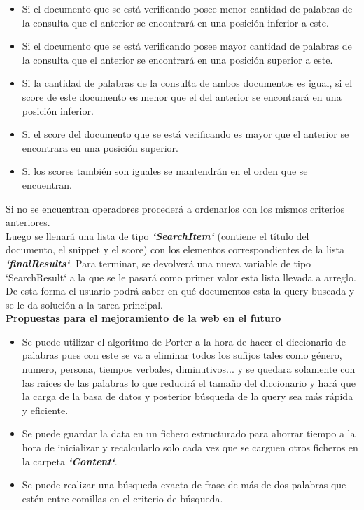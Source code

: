 \documentclass{article}
\begin{document}
\begin{flushleft}
\begin{itemize}
\item\large{Si el documento que se está verificando posee menor cantidad de palabras de la 
consulta que el anterior se encontrará en una posición inferior a este.}
\item\large{ Si el documento que se está verificando posee mayor cantidad de palabras de la 
consulta que el anterior se encontrará en una posición superior a este.}
\item\large{ Si la cantidad de palabras de la consulta de ambos documentos es igual, si el score de 
este documento es menor que el del anterior se encontrará en una posición inferior.}
\item\large{Si el score del documento que se está verificando es mayor que el anterior se 
encontrara en una posición superior.}
\item\large{ Si los scores también son iguales se mantendrán en el orden que se encuentran.}
\end{itemize}

Si no se encuentran operadores procederá a ordenarlos con los mismos criterios 
anteriores.\linebreak \\
Luego se llenará una lista de tipo \textbf{\textit{`SearchItem`}} (contiene el título del documento, el 
snippet y el score) con los elementos correspondientes de la lista \textbf{\textit{`finalResults`}}. Para 
terminar, se devolverá una nueva variable de tipo `SearchResult` a la que se le pasará
como primer valor esta lista llevada a arreglo. \linebreak \\
De esta forma el usuario podrá saber en qué documentos esta la query buscada y se le 
da solución a la tarea principal.\linebreak \\

\Large {\textbf{ Propuestas para el mejoramiento de la web en el futuro}}\linebreak \\
\begin{itemize}
\item\large{ Se puede utilizar el algoritmo de Porter a la hora de hacer el diccionario de palabras 
pues con este se va a eliminar todos los sufijos tales como género, numero, persona, 
tiempos verbales, diminutivos... y se quedara solamente con las raíces de las palabras 
lo que reducirá el tamaño del diccionario y hará que la carga de la basa de datos y 
posterior búsqueda de la query sea más rápida y eficiente.}
\item\large{ Se puede guardar la data en un fichero estructurado para ahorrar tiempo a la hora de 
inicializar y recalcularlo solo cada vez que se carguen otros ficheros en la carpeta 
\textbf{\textit{`Content`}}.}
\item\large{ Se puede realizar una búsqueda exacta de frase de más de dos palabras que estén 
entre comillas en el criterio de búsqueda.}
\end{itemize}

\end{flushleft}
\end{document}
